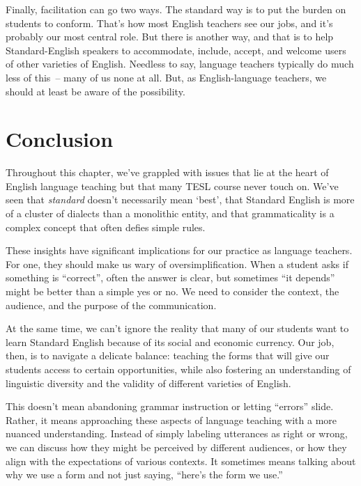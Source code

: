 Finally, facilitation can go two ways. The standard way is to put the burden on students to conform. That's how most English teachers see our jobs, and it's probably our most central role. But there is another way, and that is to help Standard-English speakers to accommodate, include, accept, and welcome users of other varieties of English. Needless to say, language teachers typically do much less of this~-- many of us none at all. But, as English-language teachers, we should at least be aware of the possibility.

\section{Conclusion}

Throughout this chapter, we've grappled with issues that lie at the heart of English language teaching but that many TESL course never touch on. We've seen that \textit{standard} doesn't necessarily mean `best', that Standard English is more of a cluster of dialects than a monolithic entity, and that grammaticality is a complex concept that often defies simple rules.

These insights have significant implications for our practice as language teachers. For one, they should make us wary of oversimplification. When a student asks if something is ``correct'', often the answer is clear, but sometimes ``it depends'' might be better than a simple yes or no. We need to consider the context, the audience, and the purpose of the communication.

At the same time, we can't ignore the reality that many of our students want to learn Standard English because of its social and economic currency. Our job, then, is to navigate a delicate balance: teaching the forms that will give our students access to certain opportunities, while also fostering an understanding of linguistic diversity and the validity of different varieties of English.

This doesn't mean abandoning grammar instruction or letting ``errors'' slide. Rather, it means approaching these aspects of language teaching with a more nuanced understanding. Instead of simply labeling utterances as right or wrong, we can discuss how they might be perceived by different audiences, or how they align with the expectations of various contexts. It sometimes means talking about why we use a form and not just saying, ``here's the form we use.''

